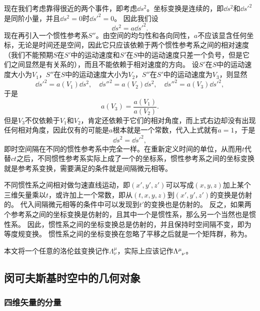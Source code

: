 现在我们考虑靠得很近的两个事件，即考虑$\dd{s^2}$。坐标变换是连续的，即$\dd{s^2}$和$\dd{s'^2}$是同阶小量，并且$\dd{s^2}=0$时$\dd{s'^2}=0$。
因此我们设
\[
    \dd{s^2} = a \dd{s'^2}.
\]
现在再引入一个惯性参考系$S''$。由空间的均匀性和各向同性，$a$不应该显含任何坐标，无论是时间还是空间，因此它只应该依赖于两个惯性参考系之间的相对速度（我们不能预期$S$在$S'$中的运动速度和$S'$在$S$中的运动速度只差一个负号，但是它们之间显然是有关系的），而且不能依赖于相对速度的方向。
设$S'$在$S$中的运动速度大小为$V_1$，$S''$在$S$中的运动速度大小为$V_2$，$S''$在$S'$中的运动速度为$V_3$，则显然
\[
    \dd{s'^2} = a(V_1) \dd{s^2}, \quad \dd{s''^2} = a(V_2) \dd{s^2}, \quad \dd{s''^2} = a(V_3) \dd{s'^2},
\]
于是
\[
    a(V_3) = \frac{a(V_1)}{a(V_2)}.
\]
但是$V_3$不仅依赖于$V_1$和$V_2$，肯定还依赖于它们的相对角度，而上式右边却没有出现任何相对角度，因此仅有的可能是$a$根本就是一个常数，代入上式就有$a = 1$，于是
\begin{equation}
    \dd{s^2} = \dd{s'^2},
\end{equation}
即时空间隔在不同的惯性参考系中完全一样。在重新定义时间的单位，从而用$t$代替$ct$之后，不同惯性参考系实际上成了一个的坐标系，惯性参考系之间的坐标变换就是参考系变换，需要满足的条件就是间隔微元相等。

不同惯性系之间相对做匀速直线运动，即$(x', y', z')$可以写成$(x, y, z)$加上某个三维矢量乘以$t$，或许加上一个常数，即从$(t, x, y, z)$到$(x', y', z')$的变换是仿射的。
代入间隔微元相等的条件中可以发现到$t'$的变换也是仿射的。
反之，如果两个参考系之间的坐标变换是仿射的，且其中一个是惯性系，那么另一个当然也是惯性系。
因此，惯性系之间的坐标变换总是仿射的，并且保持时空间隔不变，即为等度规变换。
惯性系之间的坐标变换在忽略了平移之后就是一个矩阵群，称为。

本文将一个任意的洛伦兹变换记作$\Lambda^\mu_\nu$，实际上应该记作$\Lambda\indices{^\mu_\nu}$。

\subsection{闵可夫斯基时空中的几何对象}

\subsubsection{四维矢量的分量}\label{sec:components-of-four-vector}

